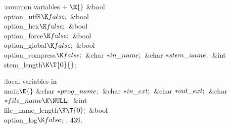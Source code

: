 \Y\B\4:common variables\X${}\mathrel+\E{}$\6
\&{bool} \\{option\_utf8}${}\K\\{false};{}$\6
\&{bool} \\{option\_hex}${}\K\\{false};{}$\6
\&{bool} \\{option\_force}${}\K\\{false};{}$\6
\&{bool} \\{option\_global}${}\K\\{false};{}$\6
\&{bool} \\{option\_compress}${}\K\\{false};{}$\6
\&{char} ${}{*}\index{in name+\\{in\_name}}\\{in\_name};{}$\6
\&{char} ${}{*}\index{stem name+\\{stem\_name}}\\{stem\_name};{}$\6
\&{int} \\{stem\_length}${}\K\T{0}{}$;
\Y
\fi


\Y\B\4:local variables in \\{main}\X${}\E{}$\6
\&{char} ${}{*}\index{prog name+\\{prog\_name}}\\{prog\_name};{}$\6
\&{char} ${}{*}\index{in ext+\\{in\_ext}}\\{in\_ext};{}$\6
\&{char} ${}{*}\index{out ext+\\{out\_ext}}\\{out\_ext};{}$\6
\&{char} ${}{*}\index{file name+\\{file\_name}}\\{file\_name}\K\NULL;{}$\6
\&{int} \\{file\_name\_length}${}\K\T{0};{}$\6
\&{bool} \\{option\_log}${}\K\\{false}{}$;
, 439.\Y
\fi

